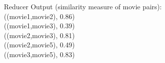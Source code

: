\documentclass{article}
\begin{document}
\begin{itemize}
\begin{itemize}
			Reducer Output (similarity measure of movie pairs):\\
			((movie1,movie2), 0.86)\\
			((movie1,movie3), 0.39)\\
			((movie2,movie3), 0.81)\\
			((movie2,movie5), 0.49)\\
			((movie3,movie5), 0.83)\\
			
	\end{itemize}
	
\end{itemize}
\end{document}
